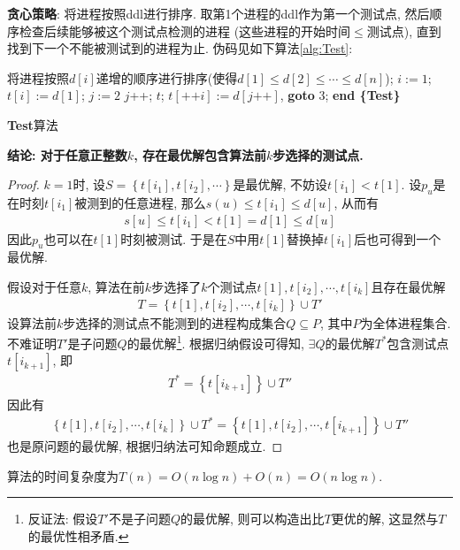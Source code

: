 \documentclass{article}
\begin{document}
\solution \textbf{贪心策略}: 将进程按照ddl进行排序. 取第1个进程的ddl作为第一个测试点, 然后顺序检查后续能够被这个测试点检测的进程 (这些进程的开始时间$\leq$测试点), 直到找到下一个不能被测试到的进程为止. 伪码见如下算法\ref{alg:Test}:
	\begin{algorithm}[H]
		\begin{algorithmic}[1]
		\State 将进程按照$d[i]$递增的顺序进行排序(使得$d[1]\leq d[2]\leq \cdots \leq d[n]$);
		\State $i:=1$; $t[i]:=d[1]$; $j:=2$ 
		 
			\State $j$++;
		\EndWhile
			\State \Return $t$;
		\Else
			\State $t[\text{++}i]:=d[j\text{++}]$, \textbf{goto} 3; 
		\EndIf
		\State \textbf{end \{Test\}}
		\end{algorithmic}
		\caption{\textbf{Test}算法}
		\label{alg:Test}
	\end{algorithm}
\textbf{结论: 对于任意正整数$k$, 存在最优解包含算法前$k$步选择的测试点.}
	\begin{proof}
		$k=1$时, 设$S=\left\{ t\left[ i_1 \right] ,t\left[ i_2 \right] ,\cdots \right\} $是最优解, 不妨设$t\left[ i_1 \right] <t\left[ 1 \right]$. 设$p_u$是在时刻$t[i_1]$被测到的任意进程, 那么$s(u)\leq t[i_1] \leq d[u]$, 从而有
		\begin{align}
			s\left[ u \right] \le t\left[ i_1 \right] <t\left[ 1 \right] =d\left[ 1 \right] \le d\left[ u \right] 
		\end{align}
		因此$p_u$也可以在$t[1]$时刻被测试. 于是在$S$中用$t[1]$替换掉$t[i_1]$后也可得到一个最优解.

		假设对于任意$k$, 算法在前$k$步选择了$k$个测试点$t[1],t[i_2],\cdots,t[i_k]$且存在最优解
		\begin{align}
			T=\left\{ t\left[ 1 \right] ,t\left[ i_2 \right] ,\cdots ,t\left[ i_k \right] \right\} \cup T'
		\end{align}
		设算法前$k$步选择的测试点不能测到的进程构成集合$Q\subseteq P$, 其中$P$为全体进程集合. 不难证明$T'$是子问题$Q$的最优解\footnote{反证法: 假设$T'$不是子问题$Q$的最优解, 则可以构造出比$T$更优的解, 这显然与$T$的最优性相矛盾.}. 根据归纳假设可得知, $\exists Q$的最优解$T^{\ast}$包含测试点$t[i_{k+1}]$, 即
		\begin{align}
			T^{\ast}=\left\{ t\left[ i_{k+1} \right] \right\} \cup T''
		\end{align}
		因此有
		\begin{align}
			\left\{ t\left[ 1 \right] ,t\left[ i_2 \right] ,\cdots ,t\left[ i_k \right] \right\} \cup T^{\ast}=\left\{ t\left[ 1 \right] ,t\left[ i_2 \right] ,\cdots ,t\left[ i_{k+1} \right] \right\} \cup T''
		\end{align}
		也是原问题的最优解, 根据归纳法可知命题成立.
	\end{proof}
算法的时间复杂度为$T\left( n \right) =O\left( n\log n \right) +O\left( n \right) =O\left( n\log n \right)$.
\end{document}
